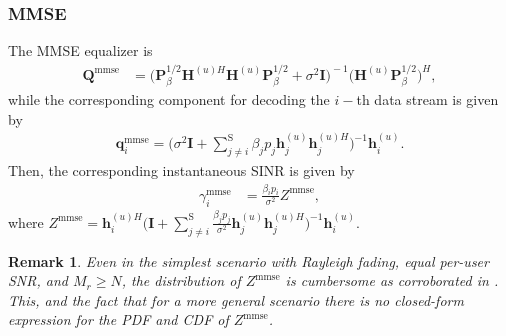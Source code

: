 \documentclass[10pt,journal,a4paper]{IEEEtran}
\newtheorem{remark}{Remark}
\begin{document}
	\subsubsection{MMSE} 
	The MMSE equalizer is 
	\begin{align}
	\mathbf{Q}^\mathrm{mmse}&\!\!=\!\Big(\!\mathbf{P}_{\!\beta}^{1/2}\mathbf{H}^{(u)H}\mathbf{H}^{(u)}\mathbf{P}_{\!\beta}^{1/2}\!+\!\sigma^2\mathbf{I}\Big)^{\!-1}\!\!\big(\mathbf{H}^{(u)}\mathbf{P}_{\!\beta}^{1/2}\big)^{\!H}\!\!,
	\end{align}
	while the corresponding component for decoding the $i-$th data stream is given by
	\begin{align}
	\mathbf{q}^\mathrm{mmse}_i=\Big(\sigma^2\mathbf{I}+\sum_{j\ne i}^{\mathrm{S} }\beta_j p_j\mathbf{h}_j^{\!(u)}\mathbf{h}_j^{\!(u)H}\Big)^{-1}\!\mathbf{h}_i^{\!(u)}.
	\end{align}
	Then, the corresponding instantaneous SINR is given by
	\begin{align}
	\gamma_i^\mathrm{mmse}&=\frac{\beta_ip_i}{\sigma^2}Z^\mathrm{mmse},\label{g2}
	\end{align}
	where $Z^\mathrm{mmse}=\mathbf{h}_i^{\!(u)H}\Big(\mathbf{I}+\sum_{j\ne i}^{\mathrm{S} }\frac{\beta_j p_j}{\sigma^2}\mathbf{h}_j^{\!(u)}\mathbf{h}_j^{\!(u)H}\Big)^{-1}\!\mathbf{h}_i^{\!(u)}$. 
	\begin{remark}\label{re6}
		Even in the simplest scenario with Rayleigh fading, equal per-user SNR, and $M_r\!\ge\! N$, the distribution of $Z^\mathrm{mmse}$ is cumbersome as corroborated in \cite{Gao.1998,Lim.2019}. This, and the fact that for a more general scenario there is no closed-form expression for the PDF and CDF of $Z^\mathrm{mmse}$.
	\end{remark}
\end{document}
